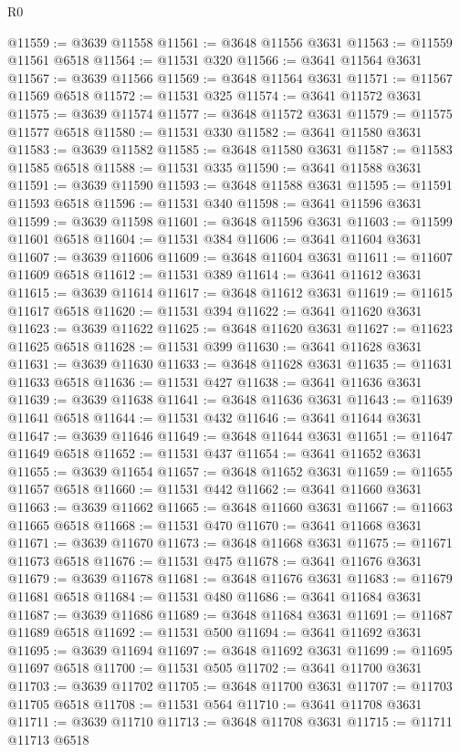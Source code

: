 \begin{lexlean}{R0}
\begin{coremodule}
@11559 := @3639 @11558
@11561 := @3648 @11556 @3631
@11563 := @11559 @11561 @6518
@11564 := @11531 @320
@11566 := @3641 @11564 @3631
@11567 := @3639 @11566
@11569 := @3648 @11564 @3631
@11571 := @11567 @11569 @6518
@11572 := @11531 @325
@11574 := @3641 @11572 @3631
@11575 := @3639 @11574
@11577 := @3648 @11572 @3631
@11579 := @11575 @11577 @6518
@11580 := @11531 @330
@11582 := @3641 @11580 @3631
@11583 := @3639 @11582
@11585 := @3648 @11580 @3631
@11587 := @11583 @11585 @6518
@11588 := @11531 @335
@11590 := @3641 @11588 @3631
@11591 := @3639 @11590
@11593 := @3648 @11588 @3631
@11595 := @11591 @11593 @6518
@11596 := @11531 @340
@11598 := @3641 @11596 @3631
@11599 := @3639 @11598
@11601 := @3648 @11596 @3631
@11603 := @11599 @11601 @6518
@11604 := @11531 @384
@11606 := @3641 @11604 @3631
@11607 := @3639 @11606
@11609 := @3648 @11604 @3631
@11611 := @11607 @11609 @6518
@11612 := @11531 @389
@11614 := @3641 @11612 @3631
@11615 := @3639 @11614
@11617 := @3648 @11612 @3631
@11619 := @11615 @11617 @6518
@11620 := @11531 @394
@11622 := @3641 @11620 @3631
@11623 := @3639 @11622
@11625 := @3648 @11620 @3631
@11627 := @11623 @11625 @6518
@11628 := @11531 @399
@11630 := @3641 @11628 @3631
@11631 := @3639 @11630
@11633 := @3648 @11628 @3631
@11635 := @11631 @11633 @6518
@11636 := @11531 @427
@11638 := @3641 @11636 @3631
@11639 := @3639 @11638
@11641 := @3648 @11636 @3631
@11643 := @11639 @11641 @6518
@11644 := @11531 @432
@11646 := @3641 @11644 @3631
@11647 := @3639 @11646
@11649 := @3648 @11644 @3631
@11651 := @11647 @11649 @6518
@11652 := @11531 @437
@11654 := @3641 @11652 @3631
@11655 := @3639 @11654
@11657 := @3648 @11652 @3631
@11659 := @11655 @11657 @6518
@11660 := @11531 @442
@11662 := @3641 @11660 @3631
@11663 := @3639 @11662
@11665 := @3648 @11660 @3631
@11667 := @11663 @11665 @6518
@11668 := @11531 @470
@11670 := @3641 @11668 @3631
@11671 := @3639 @11670
@11673 := @3648 @11668 @3631
@11675 := @11671 @11673 @6518
@11676 := @11531 @475
@11678 := @3641 @11676 @3631
@11679 := @3639 @11678
@11681 := @3648 @11676 @3631
@11683 := @11679 @11681 @6518
@11684 := @11531 @480
@11686 := @3641 @11684 @3631
@11687 := @3639 @11686
@11689 := @3648 @11684 @3631
@11691 := @11687 @11689 @6518
@11692 := @11531 @500
@11694 := @3641 @11692 @3631
@11695 := @3639 @11694
@11697 := @3648 @11692 @3631
@11699 := @11695 @11697 @6518
@11700 := @11531 @505
@11702 := @3641 @11700 @3631
@11703 := @3639 @11702
@11705 := @3648 @11700 @3631
@11707 := @11703 @11705 @6518
@11708 := @11531 @564
@11710 := @3641 @11708 @3631
@11711 := @3639 @11710
@11713 := @3648 @11708 @3631
@11715 := @11711 @11713 @6518

\end{coremodule}
\end{lexlean}
